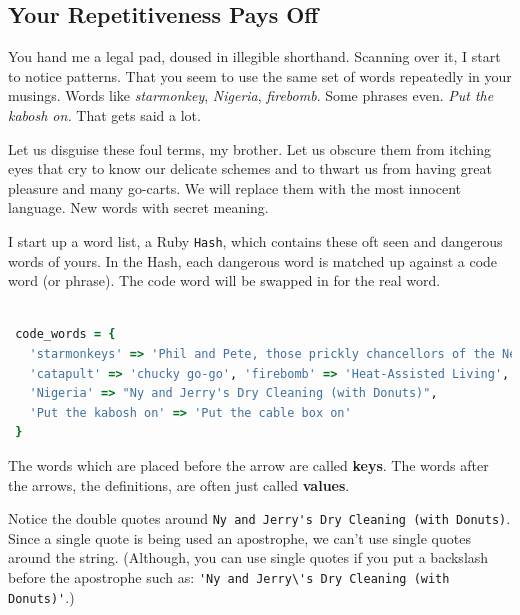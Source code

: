 \documentclass[10pt,twoside]{report}
\begin{document}
\subsection{Your Repetitiveness Pays Off}



You hand me a legal pad, doused in illegible shorthand.  Scanning over
it, I start to notice patterns.  That you seem to use the same set of
words repeatedly in your musings.  Words like {\em starmonkey}, {\em
  Nigeria}, {\em firebomb}.  Some phrases even.  {\em Put the kabosh
  on.} That gets said a lot.

Let us disguise these foul terms, my brother.  Let us obscure them
from itching eyes that cry to know our delicate schemes and to thwart
us from having great pleasure and many go-carts. We will replace them
with the most innocent language.  New words with secret meaning.

I start up a word list, a Ruby \lstinline[breaklines=true]|Hash|,
which contains these oft seen and dangerous words of yours. In the
Hash, each dangerous word is matched up against a code word (or
phrase).  The code word will be swapped in for the real word.


\begin{lstlisting}[basicstyle=\ttfamily\color{basiccolor},
    commentstyle = \ttfamily\color{commentcolor},
    keywordstyle=\ttfamily\color{keywordscolor},
    stringstyle=\color{stringcolor},
    language=Ruby,
    basicstyle=\small\ttfamily,
    showstringspaces=false,
  ]

 code_words = {
   'starmonkeys' => 'Phil and Pete, those prickly chancellors of the New Reich',
   'catapult' => 'chucky go-go', 'firebomb' => 'Heat-Assisted Living',
   'Nigeria' => "Ny and Jerry's Dry Cleaning (with Donuts)",
   'Put the kabosh on' => 'Put the cable box on'
 }

\end{lstlisting}

The words which are placed before the arrow are called {\bf keys}.
The words after the arrows, the definitions, are often just called
{\bf values}.

Notice the double quotes around \lstinline[breaklines=true]|Ny and Jerry's Dry Cleaning (with Donuts)|.  
Since a single quote is being used an apostrophe, we can't use single
quotes around the string.  (Although, you can use single quotes if you
put a backslash before the apostrophe such as:
\lstinline[breaklines=true]|'Ny and Jerry\'s Dry Cleaning (with Donuts)'|.)
\end{document}
